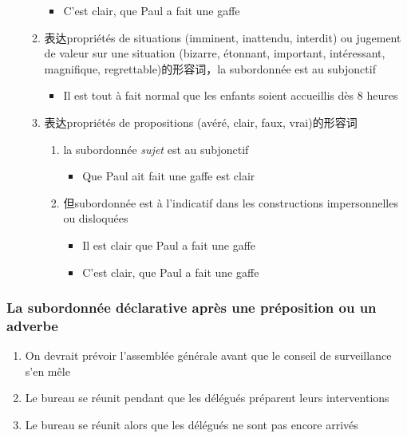 \documentclass[UTF8]{report}
\begin{document}
\begin{enumerate}
\begin{enumerate}
\begin{itemize}
            \item C’est clair, que Paul a fait une gaffe
        \end{itemize}
        \item 表达propriétés de situations (imminent, inattendu, interdit) ou jugement de valeur sur une situation (bizarre, étonnant, important, intéressant, magnifique, regrettable)的形容词，la subordonnée est au subjonctif 
        \begin{itemize}
            \item Il est tout à fait normal que les enfants soient accueillis dès 8 heures
        \end{itemize}
        \item 表达propriétés de propositions  (avéré, clair, faux, vrai)的形容词
        \begin{enumerate}
            \item la subordonnée \textit{sujet} est au subjonctif
            \begin{itemize}
                \item Que Paul ait fait une gaffe est clair
            \end{itemize}
            \item 但subordonnée est à l’indicatif dans les constructions impersonnelles ou disloquées
            \begin{itemize}
                \item Il est clair que Paul a fait une gaffe
                \item C’est clair, que Paul a fait une gaffe
            \end{itemize}
        \end{enumerate}
    \end{enumerate}
\end{enumerate}

\subsubsection{La subordonnée déclarative après une préposition ou un adverbe}
\begin{enumerate}
    \item On devrait prévoir l’assemblée générale avant que le conseil de surveillance s’en mêle
    \item Le bureau se réunit pendant que les délégués préparent leurs interventions
    \item Le bureau se réunit alors que les délégués ne sont pas encore arrivés
\end{enumerate}
\end{document}
